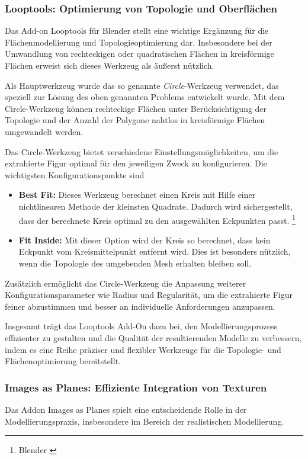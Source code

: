 \subsubsection{Looptools: Optimierung von Topologie und Oberflächen}
Das Add-on Looptools für Blender stellt eine wichtige Ergänzung für die Flächenmodellierung und Topologieoptimierung dar.
Insbesondere bei der Umwandlung von rechteckigen oder quadratischen Flächen in kreisförmige Flächen erweist sich dieses
Werkzeug als äußerst nützlich.

Als Hauptwerkzeug wurde das so genannte \textit{Circle}-Werkzeug verwendet, das speziell zur Lösung des oben genannten Problems
entwickelt wurde. Mit dem Circle-Werkzeug können rechteckige Flächen unter Berücksichtigung der Topologie und der
Anzahl der Polygone nahtlos in kreisförmige Flächen umgewandelt werden.

Das Circle-Werkzeug bietet verschiedene Einstellungsmöglichkeiten, um die extrahierte Figur optimal für den jeweiligen
Zweck zu konfigurieren. Die wichtigsten Konfigurationspunkte sind

\begin{itemize}
    \item \textbf{Best Fit:} Dieses Werkzeug berechnet einen Kreis mit Hilfe einer nichtlinearen Methode der kleinsten
    Quadrate. Dadurch wird sichergestellt, dass der berechnete Kreis optimal zu den ausgewählten Eckpunkten passt. \footnote{Blender \cite{LoopTools}}
    \item \textbf{Fit Inside:} Mit dieser Option wird der Kreis so berechnet, dass kein Eckpunkt vom Kreismittelpunkt
    entfernt wird. Dies ist besonders nützlich, wenn die Topologie des umgebenden Mesh erhalten bleiben soll.
\end{itemize}

Zusätzlich ermöglicht das Circle-Werkzeug die Anpassung weiterer Konfigurationsparameter wie Radius und Regularität, um
die extrahierte Figur feiner abzustimmen und besser an individuelle Anforderungen anzupassen.

Insgesamt trägt das Looptools Add-On dazu bei, den Modellierungsprozess effizienter zu gestalten und die Qualität der
resultierenden Modelle zu verbessern, indem es eine Reihe präziser und flexibler Werkzeuge für die Topologie- und
Flächenoptimierung bereitstellt.

\subsubsection{Images as Planes: Effiziente Integration von Texturen}
Das Addon Images as Planes spielt eine entscheidende Rolle in der Modellierungspraxis, insbesondere im Bereich der
realistischen Modellierung.

